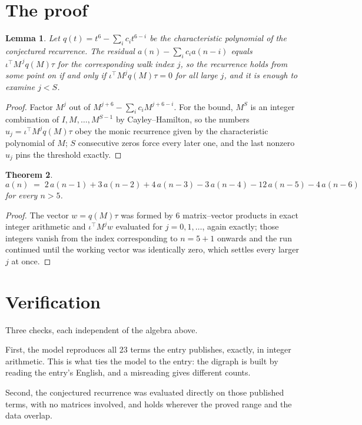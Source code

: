 \documentclass[11pt,a4paper]{article}
\theoremstyle{plain}
\newtheorem{theorem}{Theorem}
\newtheorem{lemma}[theorem]{Lemma}
\theoremstyle{definition}
\begin{document}
\section{The proof}

\begin{lemma}\label{lem:crit}
Let $q(t)=t^{6}-\sum_i c_it^{6-i}$ be the characteristic polynomial of the
conjectured recurrence. The residual $a(n)-\sum_ic_ia(n-i)$ equals
$\iota^{\!\top}M^{\,j}q(M)\tau$ for the corresponding walk index $j$, so the recurrence
holds from some point on if and only if $\iota^{\!\top}M^{j}q(M)\tau=0$ for all large $j$,
and it is enough to examine $j<S$.
\end{lemma}

\begin{proof}
Factor $M^{j}$ out of $M^{j+6}-\sum_ic_iM^{j+6-i}$. For the bound, $M^{S}$
is an integer combination of $I,M,\dots,M^{S-1}$ by Cayley--Hamilton, so the numbers
$u_j=\iota^{\!\top}M^{j}q(M)\tau$ obey the monic recurrence given by the characteristic
polynomial of $M$; $S$ consecutive zeros force every later one, and the last nonzero $u_j$
pins the threshold exactly.
\end{proof}

\begin{theorem}
\[
a(n)\;=\;2\,a(n-1) + 3\,a(n-2) + 4\,a(n-3) - 3\,a(n-4) - 12\,a(n-5) - 4\,a(n-6)
\]
for every $n>5$.
\end{theorem}

\begin{proof}
The vector $w=q(M)\tau$ was formed by $6$ matrix--vector products in exact integer
arithmetic and $\iota^{\!\top}M^{j}w$ evaluated for $j=0,1,\dots$, again exactly; those
integers vanish from the index corresponding to $n=5+1$ onwards and the run continued
until the working vector was identically zero, which settles every larger $j$ at once.
\end{proof}

\section{Verification}

Three checks, each independent of the algebra above.

First, the model reproduces all $23$ terms the entry publishes, exactly, in integer
arithmetic. This is what ties the model to the entry: the digraph is built by reading the
entry's English, and a misreading gives different counts.

Second, the conjectured recurrence was evaluated directly on those published terms, with no
matrices involved, and holds wherever the proved range and the data overlap.
\end{document}
